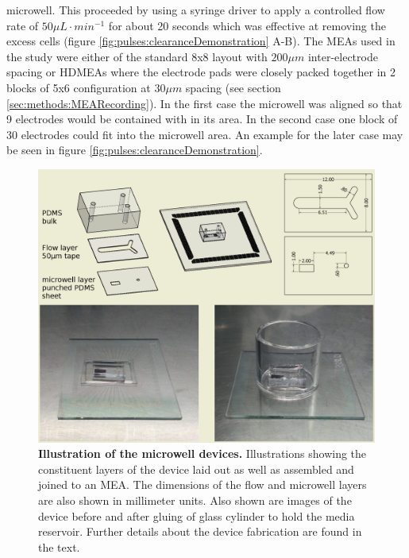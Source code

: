 microwell. This proceeded by using a syringe driver to apply a controlled flow rate of \(50 \mu L\cdot min^{-1}\) for about 20 seconds which was effective at removing the excess cells (figure \ref{fig:pulses:clearanceDemonstration} A-B). The MEAs used in the study were either of the standard 8x8 layout with \(200 \mu m\) inter-electrode spacing or HDMEAs where the electrode pads were closely packed together in 2 blocks of 5x6 configuration at \(30 \mu m\) spacing (see section \ref{sec:methods:MEARecording}). In the first case the microwell was aligned so that 9 electrodes would be contained with in its area. In the second case one block of 30 electrodes could fit into the microwell area. An example for the later case may be seen in figure \ref{fig:pulses:clearanceDemonstration}.

  \begin{figure}[h]
       \centering
       \includegraphics[width=15cm]{chapter6/figures/circularIllustration/circularIllustration.jpg}
       \caption[Illustration of the new microwell devices used for dopamine pulsing on a microculture]{\textbf{Illustration of the microwell devices.} Illustrations showing the constituent layers of the device laid out as well as assembled and joined to an MEA. The dimensions of the flow and microwell layers are also shown in millimeter units. Also shown are images of the device before and after gluing of glass cylinder to hold the media reservoir. Further details about the device fabrication are found in the text.}
       \label{fig:pulses:circularIllustration}

  \end{figure}

